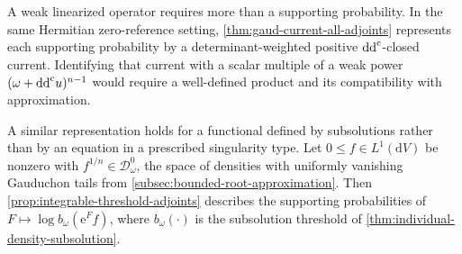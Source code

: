 A weak linearized operator requires more than a supporting probability. In the same Hermitian zero-reference setting, \cref{thm:gaud-current-all-adjoints} represents each supporting probability by a determinant-weighted positive $\mathrm{dd}^{\mathrm{c}}$-closed current. Identifying that current with a scalar multiple of a weak power $(\omega+\mathrm{dd}^{\mathrm{c}} u)^{n-1}$ would require a well-defined product and its compatibility with approximation.

A similar representation holds for a functional defined by subsolutions rather than by an equation in a prescribed singularity type. Let $0\leq f\in L^1(\mathrm{d}V)$ be nonzero with $f^{1/n}\in\mathcal D_\omega^0$, the space of densities with uniformly vanishing Gauduchon tails from \cref{subsec:bounded-root-approximation}. Then \cref{prop:integrable-threshold-adjoints} describes the supporting probabilities of $F\mapsto\log b_\omega(\mathrm{e}^Ff)$, where $b_\omega(\cdot)$ is the subsolution threshold of \cref{thm:individual-density-subsolution}.






















